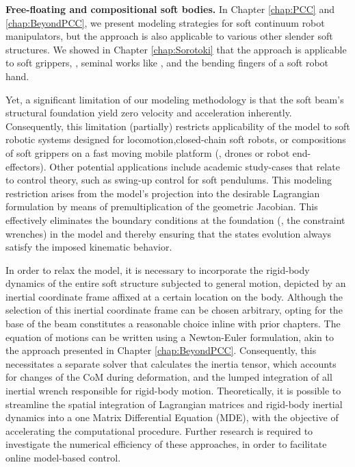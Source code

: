 \textbf{Free-floating and compositional soft bodies.} In Chapter \ref{chap:PCC} and \ref{chap:BeyondPCC}, we present modeling strategies for soft continuum robot manipulators, but the approach is also applicable to various other slender soft structures. We showed in Chapter \ref{chap:Sorotoki} that the approach is applicable to soft grippers, \eg, seminal works like \cite{Sinatra2019Aug,Suzumori1992}, and the bending fingers of a soft robot hand.

Yet, a significant limitation of our modeling methodology is that the soft beam's structural foundation yield zero velocity and acceleration inherently. Consequently, this limitation (partially) restricts applicability of the model to soft robotic systems designed for locomotion,closed-chain soft robots, or compositions of soft grippers on a fast moving mobile platform (\eg, drones or robot end-effectors). Other potential applications include academic study-cases that relate to control theory, such as swing-up control for soft pendulums. This modeling restriction arises from the model's projection into the desirable Lagrangian formulation by means of premultiplication of the geometric Jacobian. This effectively eliminates the boundary conditions at the foundation (\ie, the constraint wrenches) in the model and thereby ensuring that the states evolution always satisfy the imposed kinematic behavior.

In order to relax the model, it is necessary to incorporate the rigid-body
dynamics of the entire soft structure subjected to general motion, depicted by an inertial coordinate frame affixed at a certain location on the body. Although the selection of this inertial coordinate frame can be chosen arbitrary, opting for the base of the beam constitutes a reasonable choice inline with prior chapters. The equation of motions can be written using a Newton-Euler formulation, akin to the approach presented in Chapter \ref{chap:BeyondPCC}. Consequently, this necessitates a separate solver that calculates the inertia tensor, which accounts for changes of the CoM during deformation, and the lumped integration of all inertial wrench responsible for rigid-body motion. Theoretically, it is possible to streamline the spatial integration of Lagrangian matrices and rigid-body inertial dynamics into a one Matrix Differential Equation (MDE), with the objective of accelerating the computational procedure. Further research is required to investigate the numerical efficiency of these approaches, in order to facilitate online model-based control.

